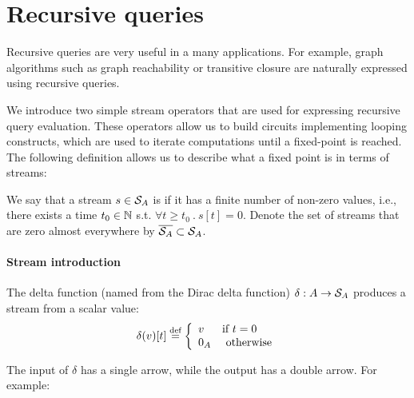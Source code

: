 \section{Recursive queries}\label{sec:recursion}

Recursive queries are very useful in a many applications.
For example, graph algorithms such as graph reachability
or transitive closure are naturally expressed using recursive queries.

We introduce two simple \dbsp stream operators that are used for
expressing recursive query evaluation.  These operators allow us
to build circuits implementing looping constructs, which
are used to iterate computations until a fixed-point is reached.
The following definition allows us to describe what a fixed point is
in terms of streams:

\begin{definition}\label{def:zae}
We say that a stream $s \in \mathcal{S}_{A}$ is  if it has a finite
number of non-zero values, i.e., there exists a time $t_0 \in \mathbb{N}$
s.t. $\forall t \geq t_0~.~s[t] = 0$.
\noindent Denote the set of streams that are zero almost everywhere
by $\overline{\mathcal{S}_{A}} \subset \mathcal{S}_{A}$.
\end{definition}

\paragraph{Stream introduction}

The delta function (named from the Dirac delta function) $\delta : A \rightarrow \mathcal{S}_{A}$
produces a stream from a scalar value:
$$\delta(v)[t] \stackrel{\textrm{\scriptsize def}}{=} \left\{
\begin{array}{ll}
  v & \mbox{if } t = 0 \\
  0_A & \mbox{ otherwise}
\end{array}
\right.
$$

The input of $\delta$ has a single arrow, while the output has a
double arrow.  For example:

\begin{center}
\end{center}

